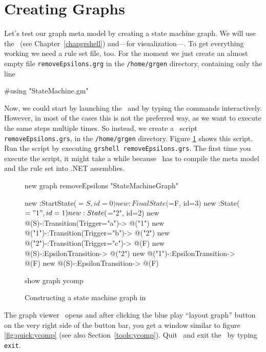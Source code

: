 \section{Creating Graphs}
\label{sct:quick:create}

Let's test our graph meta model by creating a state machine graph.
We will use the \GrShell\ (see Chapter~\ref{chapgrshell}) and---for visualization---\yComp.
To get everything working we need a rule set file, too.
For the moment we just create an almost empty file \texttt{removeEpsilons.grg} in the \texttt{/home/grgen} directory, containing only the line
\begin{grgen}
#using "StateMachine.gm"
\end{grgen}
Now, we could start by launching the \GrShell\ and by typing the commands interactively.
However, in most of the cases this is not the preferred way, as we want to execute the same steps multiple times.
So instead, we create a \GrShell\ script \texttt{removeEpsilons.grs}, in the \texttt{/home/grgen} directory.
Figure \ref{fig:quick:shell} shows this script.
Run the script by executing \texttt{grshell removeEpsilons.grs}.
The first time you execute the script, it might take a while because \GrG\ has to compile the meta model and the rule set into .NET assemblies.

\begin{figure}[htbp]
    \centering
    \begin{grgen}
new graph removeEpsilons "StateMachineGraph"

new :StartState($=S, id=0)
new :FinalState($=F, id=3)
new :State($="1", id=1)
new :State($="2", id=2)
new @(S)-:Transition(Trigger="a")-> @("1")
new @("1")-:Transition(Trigger="b")-> @("2")
new @("2")-:Transition(Trigger="c")-> @(F)
new @(S)-:EpsilonTransition-> @("2")
new @("1")-:EpsilonTransition-> @(F)
new @(S)-:EpsilonTransition-> @(F)

show graph ycomp
    \end{grgen}
    \caption{Constructing a state machine graph in \GrShell}
    \label{fig:quick:shell}
\end{figure}

The graph viewer \yComp\ opens and after clicking the blue play ``layout graph'' button on the very right side of the button bar, you get a window similar to figure \ref{fig:quick:ycomp} (see also Section~\ref{tools:ycomp}).
Quit \yComp\ and exit the \GrShell\ by typing \texttt{exit}.

